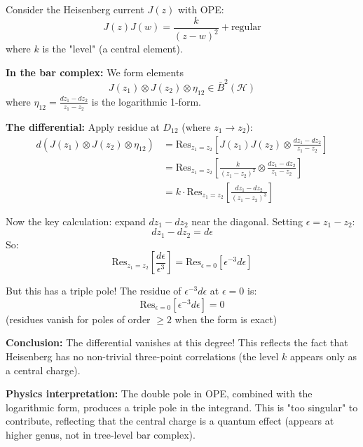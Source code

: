 \begin{example}\label{ex:ope-to-residue}
Consider the Heisenberg current $J(z)$ with OPE:
$$J(z)J(w) = \frac{k}{(z-w)^2} + \text{regular}$$
where $k$ is the "level" (a central element).

\textbf{In the bar complex:} We form elements
$$J(z_1) \otimes J(z_2) \otimes \eta_{12} \in \bar{B}^2(\mathcal{H})$$
where $\eta_{12} = \frac{dz_1 - dz_2}{z_1 - z_2}$ is the logarithmic 1-form.

\textbf{The differential:} Apply residue at $D_{12}$ (where $z_1 \to z_2$):
\begin{align*}
d(J(z_1) \otimes J(z_2) \otimes \eta_{12}) &= \text{Res}_{z_1 = z_2}\left[J(z_1)J(z_2) \otimes \frac{dz_1 - dz_2}{z_1 - z_2}\right] \\
&= \text{Res}_{z_1 = z_2}\left[\frac{k}{(z_1-z_2)^2} \otimes \frac{dz_1 - dz_2}{z_1 - z_2}\right] \\
&= k \cdot \text{Res}_{z_1 = z_2}\left[\frac{dz_1 - dz_2}{(z_1-z_2)^3}\right]
\end{align*}

Now the key calculation: expand $dz_1 - dz_2$ near the diagonal. Setting $\epsilon = z_1 - z_2$:
$$dz_1 - dz_2 = d\epsilon$$
So:
$$\text{Res}_{z_1 = z_2}\left[\frac{d\epsilon}{\epsilon^3}\right] = \text{Res}_{\epsilon=0}\left[\epsilon^{-3}d\epsilon\right]$$

But this has a triple pole! The residue of $\epsilon^{-3}d\epsilon$ at $\epsilon=0$ is:
$$\text{Res}_{\epsilon=0}[\epsilon^{-3}d\epsilon] = 0$$
(residues vanish for poles of order $\geq 2$ when the form is exact)

\textbf{Conclusion:} The differential vanishes at this degree! This reflects the fact that Heisenberg has no non-trivial three-point correlations (the level $k$ appears only as a central charge).

\textbf{Physics interpretation:} The double pole in OPE, combined with the logarithmic form, produces a triple pole in the integrand. This is "too singular" to contribute, reflecting that the central charge is a quantum effect (appears at higher genus, not in tree-level bar complex).
\end{example}

